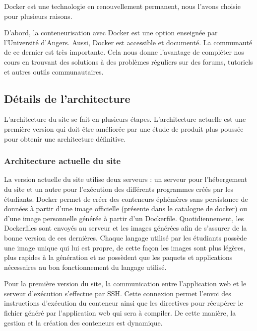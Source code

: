 \par Docker est une technologie en renouvellement permanent, nous l'avons choisie pour plusieurs raisons. \\

\par D'abord, la conteneurisation avec Docker est une option enseignée par l'Université d'Angers. Aussi, Docker est accessible et documenté. La communauté de ce dernier est très importante. Cela nous donne l’avantage de compléter nos cours en trouvant des solutions à des problèmes réguliers sur des forums, tutoriels et autres outils communautaires.


\subsection{Détails de l'architecture}

\par L’architecture du site se fait en plusieurs étapes. L'architecture actuelle est une première version qui doit être améliorée par une étude de produit plus poussée pour obtenir une architecture définitive.

\subsubsection{Architecture actuelle du site}

\par La version actuelle du site utilise deux serveurs : un serveur pour l’hébergement du site et un autre pour l’exécution des différents programmes créés par les étudiants. Docker permet de créer des conteneurs éphémères sans persistance de données à partir d’une image officielle (présente dans le catalogue de docker) ou d’une image personnelle générée à partir d’un Dockerfile. Quotidiennement, les Dockerfiles sont envoyés au serveur et les images générées afin de s’assurer de la bonne version de ces dernières. Chaque langage utilisé par les étudiants possède une image unique qui lui est propre, de cette façon les images sont plus légères, plus rapides à la génération et ne possèdent que les paquets et applications nécessaires au bon fonctionnement du langage utilisé.

\par Pour la première version du site, la communication entre l’application web et le serveur d'exécution s’effectue par SSH. Cette connexion permet l'envoi des instructions d'exécution du conteneur ainsi que les directives pour récupérer le fichier généré par l’application web qui sera à compiler. De cette manière, la gestion et la création des conteneurs est dynamique.

